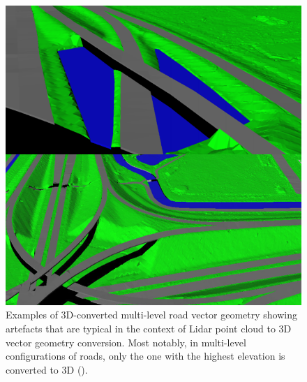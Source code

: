 \begin{figure}
    \includegraphics[width=\linewidth]{p2/figs/oudeElberink_vosselman_2006_03.png} 
    \caption{Examples of 3D-converted multi-level road vector geometry showing artefacts that are typical in the context of Lidar point cloud to 3D vector geometry conversion. Most notably, in multi-level configurations of roads, only the one with the highest elevation is converted to 3D (\cite{oudeElberink_vosselman_2006}).}
    \label{fig:conversionartefacts}
\end{figure}

